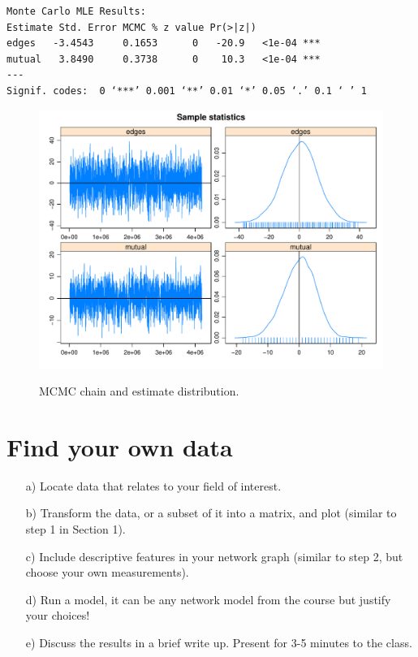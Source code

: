 \documentclass[12pt,letterpaper]{article}
\begin{document}
  

\begin{verbatim}
Monte Carlo MLE Results:
Estimate Std. Error MCMC % z value Pr(>|z|)    
edges   -3.4543     0.1653      0   -20.9   <1e-04 ***
mutual   3.8490     0.3738      0    10.3   <1e-04 ***
---
Signif. codes:  0 ‘***’ 0.001 ‘**’ 0.01 ‘*’ 0.05 ‘.’ 0.1 ‘ ’ 1
\end{verbatim}

\begin{figure}[h!]\centering
	\caption{\footnotesize{MCMC chain and estimate distribution.}}\label{fig:figure2}
	\includegraphics[width=.7\textwidth]{figure2.pdf}\\
\end{figure}

\section{Find your own data}

\begin{itemize}
	\item[a)] Locate data that relates to your field of interest.
	\item[b)] Transform the data, or a subset of it into a matrix, and plot (similar to step 1 in Section 1).
	\item [c)] Include descriptive features in your network graph (similar to step 2, but choose your own measurements).
	\item [d)] Run a model, it can be any network model from the course but justify your choices! 
	\item [e)] Discuss the results in a brief write up. Present for 3-5 minutes to the class.
\end{itemize}

  
\end{document}
